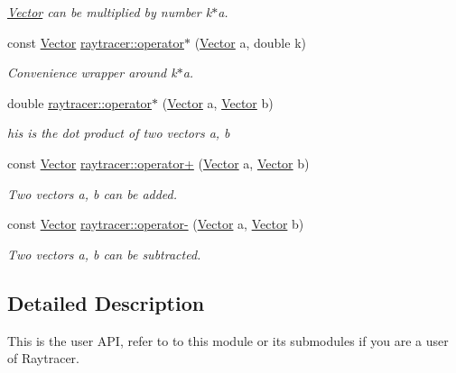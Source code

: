 \begin{DoxyCompactItemize}
\begin{DoxyCompactList}\small\item\em \hyperlink{classraytracer_1_1Vector}{Vector} can be multiplied by number k$\ast$a. \end{DoxyCompactList}\item 
const \hyperlink{classraytracer_1_1Vector}{Vector} \hyperlink{group__api_ga299354d219d40b7431474c15b9718abb}{raytracer\+::operator$\ast$} (\hyperlink{classraytracer_1_1Vector}{Vector} a, double k)
\begin{DoxyCompactList}\small\item\em Convenience wrapper around k$\ast$a. \end{DoxyCompactList}\item 
double \hyperlink{group__api_gac6d4df29b0f3bc91c6744edb04582ef7}{raytracer\+::operator$\ast$} (\hyperlink{classraytracer_1_1Vector}{Vector} a, \hyperlink{classraytracer_1_1Vector}{Vector} b)
\begin{DoxyCompactList}\small\item\em his is the dot product of two vectors a, b \end{DoxyCompactList}\item 
const \hyperlink{classraytracer_1_1Vector}{Vector} \hyperlink{group__api_gaa2334c02fb14a238c09edd45c99e33fa}{raytracer\+::operator+} (\hyperlink{classraytracer_1_1Vector}{Vector} a, \hyperlink{classraytracer_1_1Vector}{Vector} b)
\begin{DoxyCompactList}\small\item\em Two vectors a, b can be added. \end{DoxyCompactList}\item 
const \hyperlink{classraytracer_1_1Vector}{Vector} \hyperlink{group__api_ga39d9dfe9600eef5b1e29f0baebc65e1c}{raytracer\+::operator-\/} (\hyperlink{classraytracer_1_1Vector}{Vector} a, \hyperlink{classraytracer_1_1Vector}{Vector} b)
\begin{DoxyCompactList}\small\item\em Two vectors a, b can be subtracted. \end{DoxyCompactList}\end{DoxyCompactItemize}


\subsection{Detailed Description}
This is the user A\+PI, refer to to this module or its submodules if you are a user of Raytracer. 

